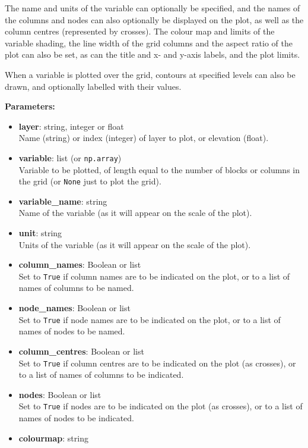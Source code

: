 The name and units of the variable can optionally be specified, and the names of the columns and nodes can also optionally be displayed on the plot, as well as the column centres (represented by crosses).  The colour map and limits of the variable shading, the line width of the grid columns and the aspect ratio of the plot can also be set, as can the title and x- and y-axis labels, and the plot limits.

When a variable is plotted over the grid, contours at specified levels can also be drawn, and optionally labelled with their values.

\textbf{Parameters:}
\begin{itemize}
\item \textbf{layer}: string, integer or float\\
  Name (string) or index (integer) of layer to plot, or elevation (float).
\item \textbf{variable}: list (or \texttt{np.array})\\
  Variable to be plotted, of length equal to the number of blocks or columns in the grid (or \texttt{None} just to plot the grid).
\item \textbf{variable\_name}: string\\
  Name of the variable (as it will appear on the scale of the plot).
\item \textbf{unit}: string\\
  Units of the variable (as it will appear on the scale of the plot).
\item \textbf{column\_names}: Boolean or list\\
  Set to \texttt{True} if column names are to be indicated on the plot, or to a list of names of columns to be named.
\item \textbf{node\_names}: Boolean or list\\
  Set to \texttt{True} if node names are to be indicated on the plot, or to a list of names of nodes to be named.
\item \textbf{column\_centres}: Boolean or list\\
  Set to \texttt{True} if column centres are to be indicated on the plot (as crosses), or to a list of names of columns to be indicated.
\item \textbf{nodes}: Boolean or list\\
  Set to \texttt{True} if nodes are to be indicated on the plot (as crosses), or to a list of names of nodes to be indicated.
\item \textbf{colourmap}: string\\

\end{itemize}
